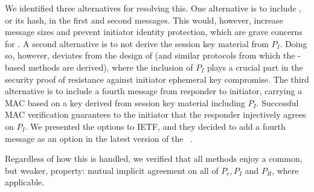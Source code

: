 \documentclass[runningheads]{llncs}
\begin{document}
We identified three alternatives for resolving this.
%
One alternative is to include \mIdcredi{}, or its hash, in the first and
second messages.
%
This would, however, increase message sizes and prevent initiator identity
protection, which are grave concerns for \mEdhoc{}.
%
A second alternative is to not derive the session key material from $P_I$.
%
Doing so, however, deviates from the design of \mOptls{} (and similar protocols
from which the \mStat{}-based methods are derived), where the inclusion of
$P_I$ plays a crucial part in the security proof of resistance against
initiator ephemeral key compromise.
%
The third alternative is to include a fourth message from responder to initiator,
carrying a MAC based on a key derived from session key material including $P_I$.
%
Successful MAC verification guarantees
to the initiator that the responder injectively agrees on $P_I$.
%
We presented the options to IETF, and they decided to add a
fourth message as an option in the latest version of the
\mSpec{}~\cite{latest-ietf-lake-edhoc-05}.
%

Regardless of how this is handled, we verified that all methods
enjoy a common, but weaker, property: mutual implicit agreement
on all of $P_e, P_I$ and $P_R$, where applicable.
%

\end{document}
